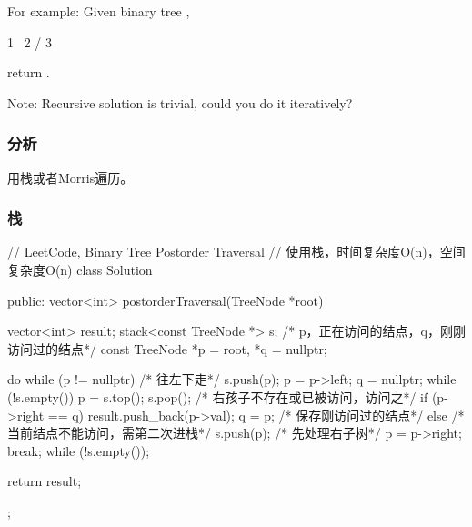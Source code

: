 For example:
Given binary tree ,
\begin{Code}
 1
  \
   2
  /
 3
\end{Code}
return \code{[3,2,1]}.

Note: Recursive solution is trivial, could you do it iteratively?


\subsubsection{分析}
用栈或者Morris遍历。


\subsubsection{栈}
\begin{Code}
// LeetCode, Binary Tree Postorder Traversal
// 使用栈，时间复杂度O(n)，空间复杂度O(n)
class Solution {
public:
    vector<int> postorderTraversal(TreeNode *root) {
        vector<int> result;
        stack<const TreeNode *> s;
        /* p，正在访问的结点，q，刚刚访问过的结点*/
        const TreeNode *p = root, *q = nullptr;

        do {
            while (p != nullptr) { /* 往左下走*/
                s.push(p);
                p = p->left;
            }
            q = nullptr;
            while (!s.empty()) {
                p = s.top();
                s.pop();
                /* 右孩子不存在或已被访问，访问之*/
                if (p->right == q) {
                    result.push_back(p->val);
                    q = p; /* 保存刚访问过的结点*/
                } else {
                    /* 当前结点不能访问，需第二次进栈*/
                    s.push(p);
                    /* 先处理右子树*/
                    p = p->right;
                    break;
                }
            }
        } while (!s.empty());

        return result;
    }
};
\end{Code}


